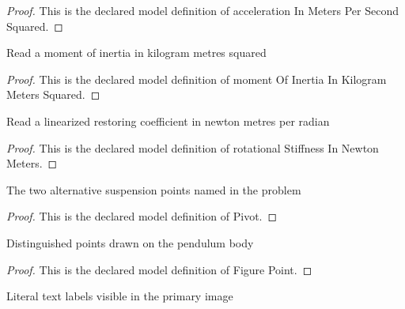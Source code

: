 \begin{proof}
  This is the declared model definition of acceleration In Meters Per Second Squared.
\end{proof}
\begin{definition}
  \label{def:physics:phyx-mini-0282:phyxminiproblems-problemphyxmini0282-momentofinertiainkilogrammeterssquared}
  Read a moment of inertia in kilogram metres squared
\end{definition}
\begin{proof}
  This is the declared model definition of moment Of Inertia In Kilogram Meters Squared.
\end{proof}
\begin{definition}
  \label{def:physics:phyx-mini-0282:phyxminiproblems-problemphyxmini0282-rotationalstiffnessinnewtonmeters}
  Read a linearized restoring coefficient in newton metres per radian
\end{definition}
\begin{proof}
  This is the declared model definition of rotational Stiffness In Newton Meters.
\end{proof}
\begin{definition}[Pivot]
  \label{def:physics:phyx-mini-0282:phyxminiproblems-problemphyxmini0282-pivot}
  The two alternative suspension points named in the problem
\end{definition}
\begin{proof}
  This is the declared model definition of Pivot.
\end{proof}
\begin{definition}
  \label{def:physics:phyx-mini-0282:phyxminiproblems-problemphyxmini0282-figurepoint}
  Distinguished points drawn on the pendulum body
\end{definition}
\begin{proof}
  This is the declared model definition of Figure Point.
\end{proof}
\begin{definition}
  \label{def:physics:phyx-mini-0282:phyxminiproblems-problemphyxmini0282-figurelabel}
  Literal text labels visible in the primary image
\end{definition}
